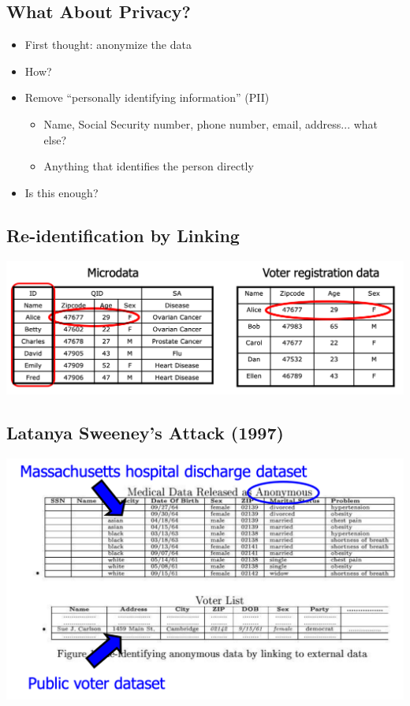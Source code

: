 \documentclass[11pt]{article}
\theoremstyle{definition}
\begin{document}
\subsection{What About Privacy?}
\begin{itemize}
    \item First thought: anonymize the data
    \item How?
    \item Remove “personally identifying information” (PII)
    \begin{itemize}
        \item Name, Social Security number, phone number, email, address... what else?
        \item Anything that identifies the person directly
    \end{itemize}
    \item Is this enough?
\end{itemize}

\subsection{Re-identification by Linking}
\includegraphics[width=\textwidth/2]{14.png}

\subsection{Latanya Sweeney’s Attack (1997)}
\includegraphics[width=\textwidth/2]{15.png}
\end{document}
